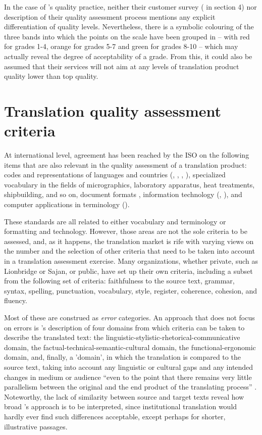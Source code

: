 \documentclass[output=paper]{langsci/langscibook}
\begin{document}
In the case of \citeauthor{SCTA2015}'s quality practice, neither their customer survey ( in section 4) nor description of their quality assessment process mentions any explicit differentiation of quality levels. Nevertheless, there is a symbolic colouring of the three bands into which the points on the scale have been grouped in  – with red for grades 1-4, orange for grades 5-7 and green for grades 8-10 – which may actually reveal the degree of acceptability of a grade. From this, it could also be assumed that their services will not aim at any levels of translation product quality lower than top quality. 


\section{Translation quality assessment criteria}\label{sec:vandepitte:4}

At international level, agreement has been reached by the ISO on the following items that are also relevant in the quality assessment of a translation product: codes and representations of languages and countries (\citeauthor{ISO2016a}, \citeauthor{ISO2013}, \citeauthor{ISO2016b}, \citeauthor{ISO2006}),
specialized vocabulary in the fields of micrographics, laboratory apparatus, heat treatments, shipbuilding, and so on, document formats \citeauthor{ISO2004}, 
information technology (\citeauthor{ISO/IEC10646}, \citeauthor{ISO1991}),
and computer applications in terminology (\citeauthor{ISO2003}). 

These standards are all related to either vocabulary and terminology or formatting and technology. However, those areas are not the sole criteria to be assessed, and, as it happens, the translation market is rife with varying views on the number and the selection of other criteria that need to be taken into account in a translation assessment exercise. Many organizations, whether private, such as Lionbridge or Sajan, or public, have set up their own criteria, including a subset from the following set of criteria: faithfulness to the source text, grammar, syntax, spelling, punctuation, vocabulary, style, register, coherence, cohesion, and fluency. 

Most of these are construed as \textit{error} categories. An approach that does not focus on errors is \citeauthor{Gouadec2010}'s description of four domains from which criteria can be taken to describe the translated text: the linguistic-stylistic-rhetorical-communicative domain, the factual-technical-semantic-cultural domain, the functional-ergonomic domain, and, finally, a 'domain', in which the translation is compared to the source text, taking into account any linguistic or cultural gaps and any intended changes in medium or audience ``even to the point that there remains very little parallelism between the original and the end product of the translating process'' \citep{Gouadec2010}. Noteworthy, the lack of similarity between source and target texts reveal how broad \citeauthor{Gouadec2010}'s approach is to be interpreted, since institutional translation would hardly ever find such differences acceptable, except perhaps for shorter, illustrative passages.
\end{document}
